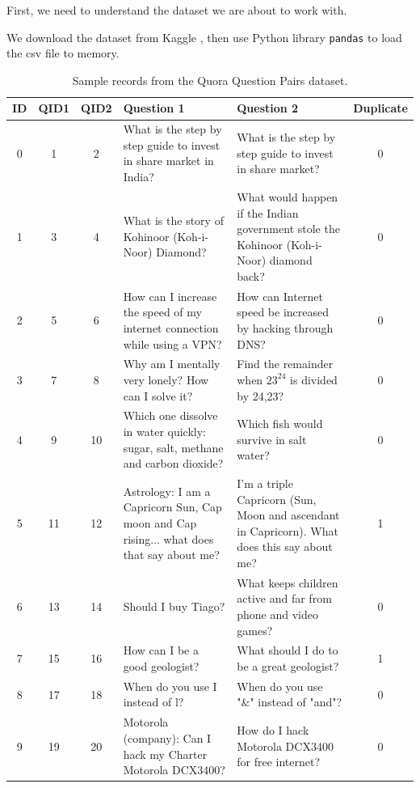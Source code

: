First, we need to understand the dataset we are about to work with.

We download the dataset from Kaggle \cite{kaggle-quora-question-pairs}, then use Python library \texttt{pandas} to load the csv file to memory.

\begin{table}[h]
\centering
\small
\begin{tabular}{c c c p{4.5cm} p{4.5cm} c}
\hline
ID & QID1 & QID2 & Question 1 & Question 2 & Duplicate \\
\hline
0 & 1 & 2 &
What is the step by step guide to invest in share market in India? &
What is the step by step guide to invest in share market? &
0 \\

1 & 3 & 4 &
What is the story of Kohinoor (Koh-i-Noor) Diamond? &
What would happen if the Indian government stole the Kohinoor (Koh-i-Noor) diamond back? &
0 \\

2 & 5 & 6 &
How can I increase the speed of my internet connection while using a VPN? &
How can Internet speed be increased by hacking through DNS? &
0 \\

3 & 7 & 8 &
Why am I mentally very lonely? How can I solve it? &
Find the remainder when $23^{24}$ is divided by 24,23? &
0 \\

4 & 9 & 10 &
Which one dissolve in water quickly: sugar, salt, methane and carbon dioxide? &
Which fish would survive in salt water? &
0 \\

5 & 11 & 12 &
Astrology: I am a Capricorn Sun, Cap moon and Cap rising... what does that say about me? &
I'm a triple Capricorn (Sun, Moon and ascendant in Capricorn). What does this say about me? &
1 \\

6 & 13 & 14 &
Should I buy Tiago? &
What keeps children active and far from phone and video games? &
0 \\

7 & 15 & 16 &
How can I be a good geologist? &
What should I do to be a great geologist? &
1 \\

8 & 17 & 18 &
When do you use I instead of l? &
When do you use "\&" instead of "and"? &
0 \\

9 & 19 & 20 &
Motorola (company): Can I hack my Charter Motorola DCX3400? &
How do I hack Motorola DCX3400 for free internet? &
0 \\
\hline
\end{tabular}
\caption{Sample records from the Quora Question Pairs dataset.}
\label{tab:quora-sample}
\end{table}

